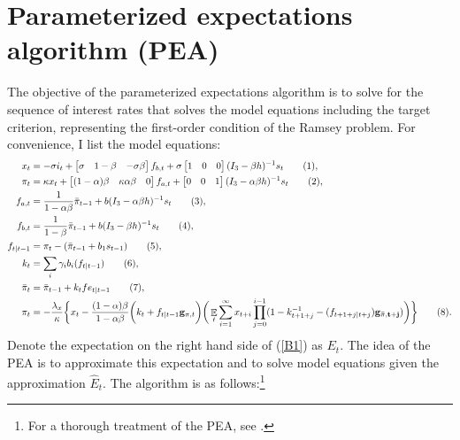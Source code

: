\documentclass[11pt]{article}
\renewcommand{\[}{\begin{equation}}
\renewcommand{\]}{\end{equation}}
\DeclareMathOperator{\E}{\mathbb{E}}
\newcommand\numberthis{\addtocounter{equation}{1}\tag{\theequation}} %
\begin{document}
\section{Parameterized expectations algorithm (PEA)} \label{pea}
The objective of the parameterized expectations algorithm is to solve for the sequence of interest rates that solves the model equations including the target criterion, representing the first-order condition of the Ramsey problem. For convenience, I list the model equations:
\begin{align*}
x_t &=  -\sigma i_t + \begin{bmatrix} \sigma & 1-\beta & -\sigma\beta \end{bmatrix} f_{b,t} + \sigma \begin{bmatrix} 1 & 0 & 0 \end{bmatrix} (I_{3} - \beta h)^{-1} s_t \label{A9} \numberthis, \\
\pi_t &= \kappa x_t  + \begin{bmatrix} (1-\alpha)\beta & \kappa\alpha\beta & 0 \end{bmatrix}  f_{a,t} + \begin{bmatrix} 0 & 0 & 1 \end{bmatrix}  (I_{3} - \alpha \beta h)^{-1}  s_t \label{A10} \numberthis ,\\
f_{a,t} & = \frac{1}{1-\alpha\beta}\bar{\pi}_{t-1}  + b(I_{3} - \alpha\beta h)^{-1}s_t \numberthis ,\\
f_{b,t} & = \frac{1}{1-\beta}\bar{\pi}_{t-1}  + b(I_{3} - \beta h)^{-1}s_t  \label{A8} \numberthis ,\\
 f_{t|t-1} &  = \pi_t - (\bar{\pi}_{t-1}+b_1 s_{t-1}) \label{A7} \numberthis ,\\
 k_t & = \sum_i \gamma_i b_i(f_{t|t-1}) \numberthis , \\
 \bar{\pi}_{t} &  = \bar{\pi}_{t-1} +k_tfe_{t|t-1} \numberthis ,\\
 \pi_t & = -\frac{\lambda_x}{\kappa}\bigg\{x_t - \frac{(1-\alpha)\beta}{1-\alpha\beta} \bigg(k_t+f_{t|t-1}\mathbf{g}_{\pi,t} \bigg) \bigg(\E_t\sum_{i=1}^{\infty}x_{t+i}\prod_{j=0}^{i-1}(1-k_{t+1+j}^{-1} - (f_{t+1+j|t+j})\mathbf{g_{\bar{\pi}, t+j}}) \bigg)
\bigg\} \numberthis \label{B1}.
\end{align*}
Denote the expectation on the right hand side of (\ref{B1}) as $E_t$. The idea of the PEA is to approximate this expectation and to solve model equations given the approximation $\hat{E}_t$. The algorithm is as follows:\footnote{For a thorough treatment of the PEA, see \cite{christiano2000occasionally}.}
\end{document}
